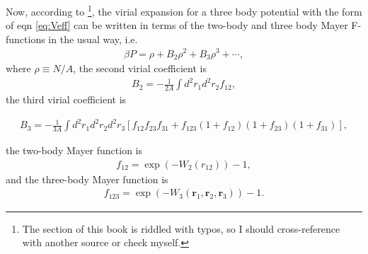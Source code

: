 \documentclass[../main.tex]{subfiles}
\begin{document}
Now, according to \cite{LEE198895}
\footnote{The section of this book is riddled with
  typos, so I should cross-reference with another source or check myself.},
the virial expansion for a three body potential with the form of eqn
\ref{eq:Veff} can be written in terms of the two-body and three body
Mayer F-functions in the usual way, i.e.
\begin{align}
  \beta P = \rho + B_2\rho^2 +B_3\rho^3+\cdots,
\end{align}
where $\rho\equiv N/A$, the second virial coefficient is
\begin{align}\label{eq:B2}
  B_2=-\frac{1}{2A}\int d^2r_1 d^2r_2 f_{12},
\end{align}
the third virial coefficient is
\begin{widetext}
  \begin{align}\label{eq:B3}
    B_3=-\frac{1}{3A}\int d^2r_1 d^2r_2 d^2r_3
    [f_{12}f_{23}f_{31}+f_{123}(1+f_{12})(1+f_{23})(1+f_{31})],
  \end{align}
  \end{widetext}
the two-body Mayer function is
\begin{align}\label{eq:f12}
  f_{12} = \exp(-W_2(r_{12}))-1,
\end{align}
and the three-body Mayer function is
\begin{align}\label{eq:f13}
  f_{123} = \exp(-W_3(\bm{r}_1,\bm{r}_2,\bm{r}_3))-1.
\end{align}
\end{document}
